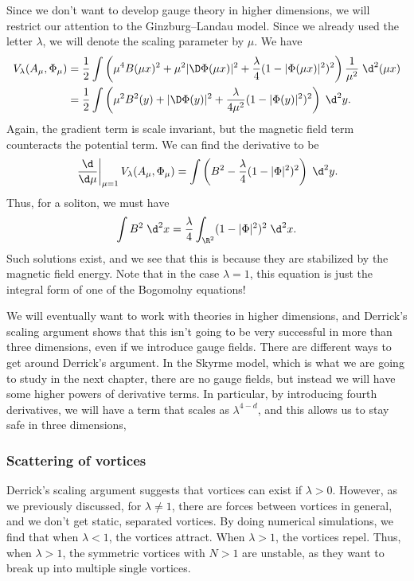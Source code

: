 \documentclass[a4paper]{article}
\begin{document}
Since we don't want to develop gauge theory in higher dimensions, we will restrict our attention to the Ginzburg--Landau model. Since we already used the letter $\lambda$, we will denote the scaling parameter by $\mu$. We have
\begin{align*}
  V_\lambda(A_\mu, \Phi_\mu) &= \frac{1}{2} \int \left(\mu^4 B(\mu x)^2 + \mu^2 |\D \Phi(\mu x)|^2 + \frac{\lambda}{4} (1 - |\Phi(\mu x)|^2)^2\right) \frac{1}{\mu^2}\;\d^2 (\mu x)\\
  &= \frac{1}{2} \int \left(\mu^2 B^2(y) + |\D \Phi(y)|^2 + \frac{\lambda}{4 \mu^2} (1 - |\Phi(y)|^2)^2\right)\;\d^2 y.
\end{align*}
Again, the gradient term is scale invariant, but the magnetic field term counteracts the potential term. We can find the derivative to be
\[
  \left.\frac{\d}{\d \mu}\right|_{\mu = 1} V_\lambda(A_\mu, \Phi_\mu) = \int \left(B^2 - \frac{\lambda}{4}(1 - |\Phi|^2)^2\right)\;\d^2 y.
\]
Thus, for a soliton, we must have
\[
  \int B^2\;\d^2 x = \frac{\lambda}{4} \int_{\R^2} (1 - |\Phi|^2)^2 \;\d^2 x.
\]
Such solutions exist, and we see that this is because they are stabilized by the magnetic field energy. Note that in the case $\lambda = 1$, this equation is just the integral form of one of the Bogomolny equations!

We will eventually want to work with theories in higher dimensions, and Derrick's scaling argument shows that this isn't going to be very successful in more than three dimensions, even if we introduce gauge fields. There are different ways to get around Derrick's argument. In the Skyrme model, which is what we are going to study in the next chapter, there are no gauge fields, but instead we will have some higher powers of derivative terms. In particular, by introducing fourth derivatives, we will have a term that scales as $\lambda^{4 - d}$, and this allows us to stay safe in three dimensions,

\subsubsection*{Scattering of vortices}
Derrick's scaling argument suggests that vortices can exist if $\lambda > 0$. However, as we previously discussed, for $\lambda \not= 1$, there are forces between vortices in general, and we don't get static, separated vortices. By doing numerical simulations, we find that when $\lambda < 1$, the vortices attract. When $\lambda > 1$, the vortices repel. Thus, when $\lambda > 1$, the symmetric vortices with $N > 1$ are unstable, as they want to break up into multiple single vortices.
\end{document}
